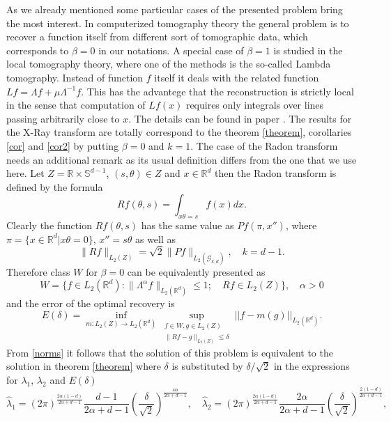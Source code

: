 \documentclass[12pt]{iopart}
\begin{document}
As we already mentioned some particular cases of the presented problem bring the most interest. In computerized tomography theory the general problem is to recover a function itself from different sort of tomographic data, which corresponds to $\beta=0$ in our notations. A special case of $\beta=1$ is studied in the local tomography theory, where one of the methods is the so-called Lambda tomography. Instead of function $f$ itself it deals with the related function $Lf = \Lambda f+\mu\Lambda^{-1}f$. This has the advantege that the reconstruction is strictly local in the sense that computation of $Lf(x)$ requires only integrals over lines passing arbitrarily close to $x$. The details can be found in paper \cite{FKNRS}.
The results for the X-Ray transform are totally correspond to the theorem \ref{theorem}, corollaries \ref{cor} and \ref{cor2} by putting $\beta=0$ and $k=1$. The case of the Radon transform needs an additional remark as its usual definition differs from the one that we use here. Let $Z=\mathbb R\times\mathbb S^{d-1}$, $(s,\theta)\in Z$ and $x\in\mathbb R^d$ then the Radon transform is defined by the formula 
$$Rf(\theta,s)=\int_{x\theta=s}f(x)dx.$$
Clearly the function $Rf(\theta,s)$ has the same value as $Pf(\pi,x'')$, where $\pi=\{x\in\mathbb R^d | x\theta=0\}$, $x''=s\theta$ as well as
\begin{equation}
\label{norms}
\|Rf\|_{L_2(Z)}=\sqrt{2}\|Pf\|_{L_2(\mathcal G_{k,d})},\quad k=d-1.
\end{equation}
Therefore class $W$ for $\beta=0$ can be equivalently presented as 
$$ W=\{f\in L_2(\mathbb R^d) :
\|\Lambda^\alpha f\|_{L_2(\mathbb R^d)}\leqslant  1;\quad Rf\in L_2(Z) \},\quad\alpha>0$$
and the error of the optimal recovery is
$$
E(\delta)=\inf_{m:L_2(Z)\rightarrow L_2(\mathbb R^d)}\sup_{
  \begin{smallmatrix}
f\in W, g\in L_2(Z)\\ 
\|Rf-g\|_{L_2(Z)}\leqslant \delta
\end{smallmatrix}} ||f-m(g)||_{L_2(\mathbb R^d)}.
$$
From \eqref{norms} it follows that the solution of this problem is equivalent to the solution in theorem \ref{theorem} where $\delta$ is substituted by $\delta/\sqrt{2}$ in the expressions for $\lambda_1$, $\lambda_2$ and $E(\delta)$
$$
 \widehat\lambda_1=(2\pi)^{\frac{2\alpha(1-d)}{2\alpha+d-1}}\frac{d-1}{2\alpha+d-1}\left(\frac{\delta}{\sqrt{2}}\right)^\frac{4\alpha}{2\alpha+d-1},\quad \widehat\lambda_2=(2\pi)^{\frac{2\alpha(1-d)}{2\alpha+d-1}}\frac{2\alpha}{2\alpha+d-1}\left(\frac{\delta}{\sqrt{2}}\right)^\frac{2(1-d)}{2\alpha+d-1}, 
$$
\end{document}
